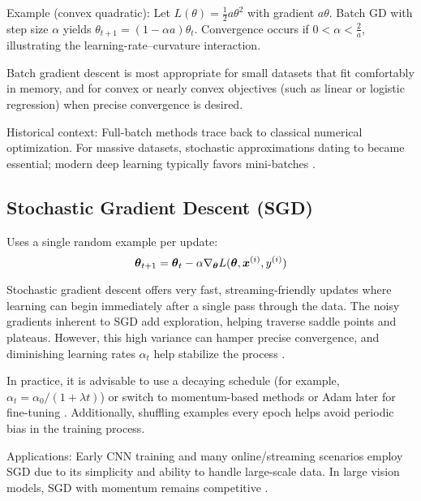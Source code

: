 Example (convex quadratic): Let \(L(\theta)=\tfrac{1}{2}a\theta^2\) with gradient \(a\theta\). Batch GD with step size \(\alpha\) yields \(\theta_{t+1}=(1-\alpha a)\theta_t\). Convergence occurs if \(0<\alpha<\tfrac{2}{a}\), illustrating the learning-rate–curvature interaction.

Batch gradient descent is most appropriate for small datasets that fit comfortably in memory, and for convex or nearly convex objectives (such as linear or logistic regression) when precise convergence is desired.

Historical context: Full-batch methods trace back to classical numerical optimization. For massive datasets, stochastic approximations dating to \cite{RobbinsMonro1951} became essential; modern deep learning typically favors mini-batches \cite{GoodfellowEtAl2016,WebOptimizationDLBook,D2LChapterOptimization}.

\subsection{Stochastic Gradient Descent (SGD)}

Uses a single random example per update:
\begin{equation}
\boldsymbol{\theta}_{t+1} = \boldsymbol{\theta}_t - \alpha \nabla_{\boldsymbol{\theta}} L(\boldsymbol{\theta}, \boldsymbol{x}^{(i)}, y^{(i)})
\end{equation}

Stochastic gradient descent offers very fast, streaming-friendly updates where learning can begin immediately after a single pass through the data. The noisy gradients inherent to SGD add exploration, helping traverse saddle points and plateaus. However, this high variance can hamper precise convergence, and diminishing learning rates \(\alpha_t\) help stabilize the process \cite{RobbinsMonro1951}.

In practice, it is advisable to use a decaying schedule (for example, \(\alpha_t = \alpha_0/(1+\lambda t)\)) or switch to momentum-based methods or Adam later for fine-tuning \cite{WebOptimizationDLBook,D2LChapterOptimization}. Additionally, shuffling examples every epoch helps avoid periodic bias in the training process.

Applications: Early CNN training and many online/streaming scenarios employ SGD due to its simplicity and ability to handle large-scale data. In large vision models, SGD with momentum remains competitive \cite{He2016}.

